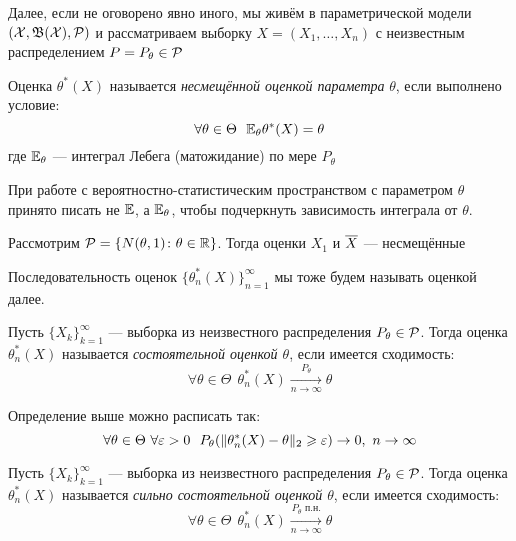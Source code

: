\begin{note}
	Далее, если не оговорено явно иного, мы живём в параметрической модели $(\mathcal{X}, \mathfrak{B}(\mathcal{X}), \mathcal{P})$ и рассматриваем выборку $X = (X_1, \ldots, X_n)$ с неизвестным распределением $P = P_\theta \in \mathcal{P}$
\end{note}

\begin{definition}
	Оценка $\theta^*(X)$ называется \textit{несмещённой оценкой параметра} $\theta$, если выполнено условие:
	\[
		\forall \theta \in \Theta\ \ \mathbb{E}_\theta \theta^*(X) = \theta
	\]
	где $\mathbb{E}_\theta$ --- интеграл Лебега (матожидание) по мере $P_\theta$
\end{definition}

\begin{anote}
	При работе с вероятностно-статистическим пространством с параметром $\theta$ принято писать не $\mathbb{E}$, а $\mathbb{E}_\theta$, чтобы подчеркнуть зависимость интеграла от $\theta$.
\end{anote}

\begin{example}
	Рассмотрим $\mathcal{P} = \{N(\theta, 1) \colon \theta \in \mathbb{R}\}$. Тогда оценки $X_1$ и $\overline{X}$ --- несмещённые
\end{example}

\begin{anote}
	Последовательность оценок $\{\theta_n^*(X)\}_{n = 1}^\infty$ мы тоже будем называть оценкой далее.
\end{anote}

\begin{definition}
	Пусть $\{X_k\}_{k = 1}^\infty$ --- выборка из неизвестного распределения $P_\theta \in \mathcal{P}$. Тогда оценка $\theta_n^*(X)$ называется \textit{состоятельной оценкой $\theta$}, если имеется сходимость:
	\[
		\forall \theta \in \Theta\ \ \theta_n^*(X) \xrightarrow[n \to \infty]{P_\theta} \theta
	\]
\end{definition}

\begin{note}
	Определение выше можно расписать так:
	\[
		\forall \theta \in \Theta\ \forall \eps > 0\ \ P_\theta(\|\theta_n^*(X) - \theta\|_2 \ge \eps) \to 0,\ n \to \infty
	\]
\end{note}

\begin{definition}
	Пусть $\{X_k\}_{k = 1}^\infty$ --- выборка из неизвестного распределения $P_\theta \in \mathcal{P}$. Тогда оценка $\theta_n^*(X)$ называется \textit{сильно состоятельной оценкой $\theta$}, если имеется сходимость:
	\[
		\forall \theta \in \Theta\ \ \theta_n^*(X) \xrightarrow[n \to \infty]{P_\theta\text{ п.н.}} \theta
	\]
\end{definition}

